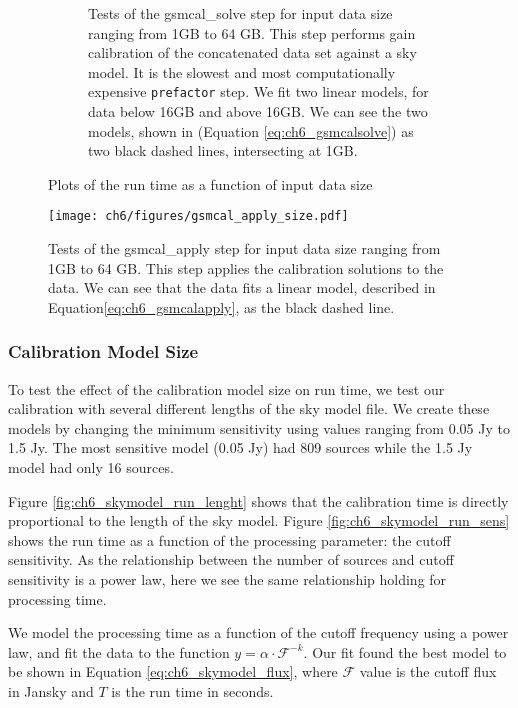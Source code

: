 \begin{figure*}[t!]
\begin{subfigure}[b]{0.44\textwidth}
            {{\small Tests of the {\selectfont gsmcal\_solve} step for input data size ranging from 1GB to 64 GB. This step performs gain calibration of the concatenated data set against a sky model. It is the slowest and most computationally expensive \texttt{prefactor} step. We fit two linear models, for data below 16GB and above 16GB. We can see the two models, shown in  (Equation \ref{eq:ch6_gsmcalsolve}) as two black dashed lines, intersecting at 1GB.}}    
            \label{fig:ch6_gsmcalsolve_size}
        \end{subfigure}
        \caption[Plots of the run time as a function of input data size]
        {\small Plots of the run time as a function of input data size} 
\end{figure*}


\begin{figure}
\texttt{[image: ch6/figures/gsmcal\_apply\_size.pdf]}
        \caption[Tests of the {\selectfont gsmcal\_apply} step for data from 1GB to 64GB]{\small Tests of the {\selectfont gsmcal\_apply} step for input data size ranging from 1GB to 64 GB. This step applies the calibration solutions to the data. We can see that the data fits a linear model, described in Equation\ref{eq:ch6_gsmcalapply}, as the black dashed line.}
            \label{fig:ch6_gsmcalapply_size}
\end{figure}

\subsubsection{Calibration Model Size}
To test the effect of the calibration model size on run time, we test our calibration with several different lengths of the sky model file. We create these models by changing the minimum sensitivity using values ranging from 0.05 Jy to 1.5 Jy. The most sensitive model (0.05 Jy) had 809 sources while the 1.5 Jy model had only 16 sources. 

Figure \ref{fig:ch6_skymodel_run_lenght} shows that the calibration time is directly proportional to the length of the sky model. Figure \ref{fig:ch6_skymodel_run_sens} shows the run time as a function of the processing parameter: the cutoff sensitivity. As the relationship between the number of sources and cutoff sensitivity is a power law, here we see the same relationship holding for processing time.

We model the processing time as a function of the cutoff frequency using a power law, and fit the data to the function $y=\alpha\cdot \mathcal{F}^{-k}$. Our fit found the best model to be shown in Equation \ref{eq:ch6_skymodel_flux}, where $\mathcal{F}$ value is the cutoff flux in Jansky and $T$ is the run time in seconds. 

